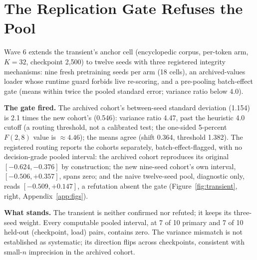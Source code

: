\section{The Replication Gate Refuses the Pool}
\label{sec:replication}

Wave 6 extends the transient's anchor cell (encyclopedic corpus, per-token
arm, $K{=}32$, checkpoint 2{,}500) to twelve seeds with three registered
integrity mechanisms: nine fresh pretraining seeds per arm (18 cells), an
archived-values loader whose runtime guard forbids live re-scoring,
and a pre-pooling batch-effect gate (means within twice the pooled
standard error; variance ratio below 4.0).

\textbf{The gate fired.} The archived cohort's between-seed standard
deviation (1.154) is 2.1 times the new cohort's (0.546): variance ratio
4.47, past the heuristic 4.0 cutoff (a routing threshold, not a calibrated
test; the one-sided 5-percent $F(2,8)$ value is ${\approx}4.46$); the
means agree (shift 0.364, threshold 1.382). %
The registered routing reports the cohorts separately, batch-effect-flagged,
with no decision-grade pooled interval: the archived cohort reproduces its
original $[-0.624, -0.376]$ by construction; the new nine-seed cohort's own
interval, $[-0.506, +0.357]$, spans zero; %
and the naive twelve-seed pool, diagnostic only, reads $[-0.509, +0.147]$,
a refutation absent the gate %
(Figure~\ref{fig:transient}, right, Appendix~\ref{app:figs}).

\textbf{What stands.} The transient is neither confirmed nor refuted; it
keeps its three-seed weight. Every computable pooled interval, at 7 of 10
primary and 7 of 10 held-out (checkpoint, load) pairs, contains zero.
The variance mismatch is not established as systematic; its direction
flips across checkpoints, consistent with small-$n$ imprecision in the
archived cohort.
